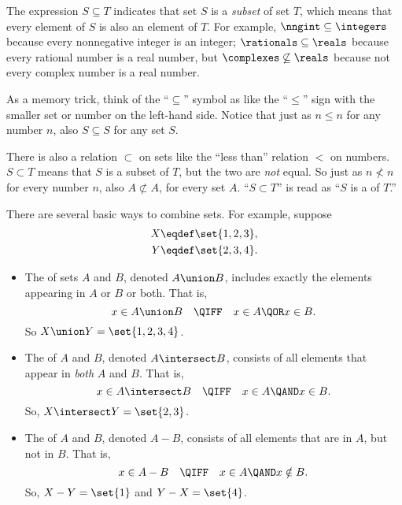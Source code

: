The expression $S \subseteq T$ indicates that set $S$ is a
\emph{subset} of set $T$, which means that
every element of $S$ is also an element of $T$.  For example,
$\nngint \subseteq \integers$ because every nonnegative integer is
an integer; $\rationals \subseteq \reals$ because every rational
number is a real number, but $\complexes \not\subseteq \reals$ because
not every complex number is a real number.

As a memory trick, think of the ``$\subseteq$'' symbol as like the ``$\leq$''
sign with the smaller set or number on the left-hand side.  Notice
that just as $n \leq n$ for any number $n$, also $S \subseteq S$ for
any set $S$.

There is also a relation $\subset$ on sets like the ``less than''
relation $<$ on numbers.  $S \subset T$ means that $S$ is a subset of
$T$, but the two are \emph{not} equal.  So just as $n \not< n$ for
every number $n$, also $A \not\subset A$, for every set $A$.  ``$S
\subset T$'' is read as ``$S$ is a  of $T$.''

There are several basic ways to combine sets.  For example, suppose
\begin{align*}
X & \eqdef \set{1, 2, 3}, \\
Y & \eqdef \set{2, 3, 4}.
\end{align*}

\begin{definition}
\mbox{}

\begin{itemize}
\item The  of sets $A$ and $B$, denoted $A \union B$,
  includes exactly the elements appearing in $A$ or $B$ or both.  That is,
\[
x \in A \union B\quad \QIFF\quad x \in A \QOR x \in B.
\]
So $X \union Y = \set{1, 2, 3, 4}$.

\item The  of $A$ and $B$, denoted $A \intersect
  B$, consists of all elements that appear in \textit{both} $A$ and
  $B$.  That is,
\[
x \in A \intersect B\quad \QIFF\quad x \in A \QAND x \in B.
\]
So, $X \intersect Y = \set{2, 3}$.

\item The  of $A$ and $B$, denoted $A-B$,
  consists of all elements that are in $A$, but not in $B$.  That is,
\[
x \in A - B\quad \QIFF\quad  x \in A \QAND x \notin B.
\]
So, $X -  Y = \set{1}$ and $Y - X = \set{4}$.

\end{itemize}
\end{definition}

